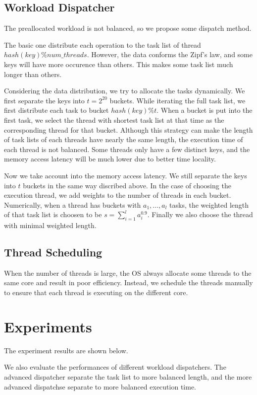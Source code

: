 \documentclass[10pt,letterpaper]{article}
\begin{document}
	\subsection {Workload Dispatcher}
		The preallocated workload is not balanced, so we propose some dispatch method.

		The basic one distribute each operation to the task list of thread $hash(key) \% num\_threads$. However, the data conforms the Zipf's law, and some keys will have more occurence than others. This makes some task list much longer than others.

		Considering the data distribution, we try to allocate the tasks dynamically. We first separate the keys into $t = 2^{20}$ buckets. While iterating the full task list, we first distribute each task to bucket $hash(key) \% t$. When a bucket is put into the first task, we select the thread with shortest task list at that time as the corresponding thread for that bucket. Although this strategy can make the length of task lists of each threads have nearly the same length, the execution time of each thread is not balanced. Some threads only have a few distinct keys, and the memory access latency will be much lower due to better time locality.

		Now we take account into the memory access latency. We still separate the keys into $t$ buckets in the same way discribed above. In the case of choosing the execution thread, we add weights to the number of threads in each bucket. Numerically, when a thread has buckets with $a_1, \ldots, a_l$ tasks, the weighted length of that task list is choosen to be $s = \sum_{i=1}^l a_i^{0.9}$. Finally we also choose the thread with minimal weighted length.

	\subsection {Thread Scheduling}
		When the number of threads is large, the OS always allocate some threads to the same core and result in poor efficiency. Instead, we schedule the threads manually to ensure that each thread is executing on the different core.

\section {Experiments}
	The experiment results are shown below.

	We also evaluate the performances of different workload dispatchers. The advanced dispatcher separate the task list to more balanced length, and the more advanced dispatchse separate to more balanced execution time.
\end{document}
